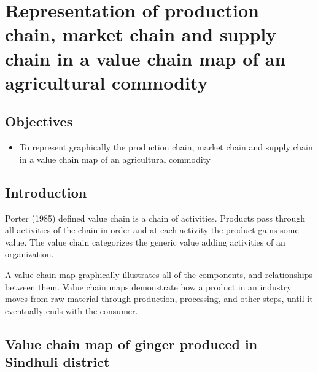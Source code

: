 \documentclass[
]{article}
\providecommand{\tightlist}{%
  \setlength{\itemsep}{0pt}\setlength{\parskip}{0pt}}
\begin{document}
\clearpage

\hypertarget{representation-of-production-chain-market-chain-and-supply-chain-in-a-value-chain-map-of-an-agricultural-commodity}{%
\section{Representation of production chain, market chain and supply chain in a value chain map of an agricultural commodity}\label{representation-of-production-chain-market-chain-and-supply-chain-in-a-value-chain-map-of-an-agricultural-commodity}}

\hypertarget{objectives-8}{%
\subsection*{Objectives}\label{objectives-8}}

\begin{itemize}
\tightlist
\item
  To represent graphically the production chain, market chain and supply chain in a value chain map of an agricultural commodity
\end{itemize}

\hypertarget{introduction-4}{%
\subsection*{Introduction}\label{introduction-4}}

Porter (1985) defined value chain is a chain of activities. Products pass through all activities of the chain in order and at each activity the product gains some value. The value chain categorizes the generic value adding activities of an organization.

A value chain map graphically illustrates all of the components, and relationships between them. Value chain maps demonstrate how a product in an industry moves from raw material through production, processing, and other steps, until it eventually ends with the consumer.

\hypertarget{value-chain-map-of-ginger-produced-in-sindhuli-district}{%
\subsection*{Value chain map of ginger produced in Sindhuli district}\label{value-chain-map-of-ginger-produced-in-sindhuli-district}}
\end{document}
